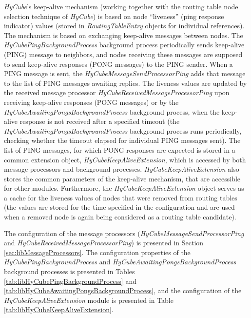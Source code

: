 \emph{HyCube}'s keep-alive mechanism (working together with the routing table node selection technique of \emph{HyCube}) is based on node ``liveness'' (ping response indicator) values (stored in \emph{RoutingTableEntry} objects for individual references). The mechanism is based on exchanging keep-alive messages between nodes. The \emph{HyCubePingBackgroundProcess} background process periodically sends keep-alive (PING) message to neighbors, and nodes receiving these messages are supposed to send keep-alive responses (PONG messages) to the PING sender. When a PING message is sent, the \emph{HyCubeMessageSendProcessorPing} adds that message to the list of PING messages awaiting replies. The liveness values are updated by the received message processor \emph{HyCubeReceivedMessageProcessorPing} upon receiving keep-alive responses (PONG messages) or by the \emph{HyCubeAwaitingPongsBackgroundProcess} background process, when the keep-alive response is not received after a specified timeout (the \emph{HyCubeAwaitingPongsBackgroundProcess} background process runs periodically, checking whether the timeout elapsed for individual PING messages sent). The list of PING messages, for which PONG responses are expected is stored in a common extension object, \emph{HyCubeKeepAliveExtension}, which is accessed by both message processors and background processes. \emph{HyCubeKeepAliveExtension} also stores the common parameters of the keep-alive mechanism, that are accessible for other modules. Furthermore, the \emph{HyCubeKeepAliveExtension} object serves as a cache for the liveness values of nodes that were removed from routing tables (the values are stored for the time specified in the configuration and are used when a removed node is again being considered as a routing table candidate).

The configuration of the message processors (\emph{HyCubeMessageSendProcessorPing} and \emph{HyCubeReceivedMessageProcessorPing}) is presented in Section \ref{sec:libMessageProcessors}. The configuration properties of the \emph{HyCubePingBackgroundProcess} and \emph{HyCubeAwaitingPongsBackgroundProcess} background processes is presented in Tables \ref{tab:libHyCubePingBackgroundProcess} and \ref{tab:libHyCubeAwaitingPongsBackgroundProcess}, and the configuration of the \emph{HyCubeKeepAliveExtension} module is presented in Table \ref{tab:libHyCubeKeepAliveExtension}.


